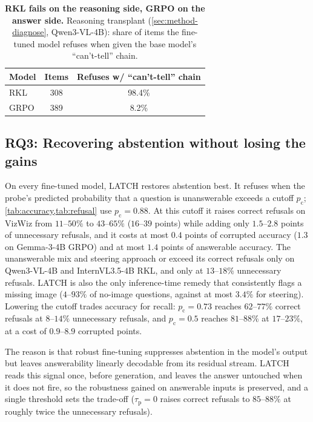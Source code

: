 \begin{table}[tb]
\centering
\small
\caption{\textbf{RKL fails on the reasoning side, GRPO on the answer side.} Reasoning
transplant (\cref{sec:method-diagnose}, Qwen3-VL-4B): share of items the fine-tuned model
refuses when given the base model's ``can't-tell'' chain.}
\label{tab:transplant}
\begin{tabular}{@{}lcc@{}}
\toprule
Model & Items & Refuses w/ ``can't-tell'' chain \\
\midrule
RKL  & 308 & 98.4\% \\
GRPO & 389 & 8.2\% \\
\bottomrule
\end{tabular}
\end{table}

\subsection{RQ3: Recovering abstention without losing the gains}
\label{sec:rq3}


On every fine-tuned model, LATCH restores abstention best. It refuses
when the probe's predicted probability that a question is unanswerable exceeds a cutoff
$p_{\mathrm{c}}$; \cref{tab:accuracy,tab:refusal} use $p_{\mathrm{c}} = 0.88$. At this
cutoff it raises correct refusals on VizWiz from $11$--$50\%$ to $43$--$65\%$
($16$--$39$ points) while adding only $1.5$--$2.8$ points of unnecessary refusals, and it
costs at most $0.4$ points of corrupted accuracy ($1.3$ on Gemma-3-4B GRPO) and at most
$1.4$ points of answerable accuracy. The unanswerable mix and steering approach or exceed
its correct refusals only on Qwen3-VL-4B and InternVL3.5-4B RKL, and only at $13$--$18\%$
unnecessary refusals. LATCH is also the only inference-time remedy that consistently
flags a missing image ($4$--$93\%$ of no-image questions, against at most $3.4\%$ for
steering). Lowering the cutoff trades accuracy for recall: $p_{\mathrm{c}} = 0.73$ reaches
$62$--$77\%$ correct refusals at $8$--$14\%$ unnecessary refusals, and $p_{\mathrm{c}} = 0.5$
reaches $81$--$88\%$ at $17$--$23\%$, at a cost of $0.9$--$8.9$ corrupted points.


The reason is that robust fine-tuning suppresses abstention in the model's output but
leaves answerability linearly decodable from its residual stream. LATCH reads this
signal once, before generation, and leaves the answer untouched when it does not fire, so
the robustness gained on answerable inputs is preserved, and a single threshold sets the
trade-off ($\tau_{\mathrm{p}} = 0$ raises correct refusals to $85$--$88\%$ at roughly twice
the unnecessary refusals).

